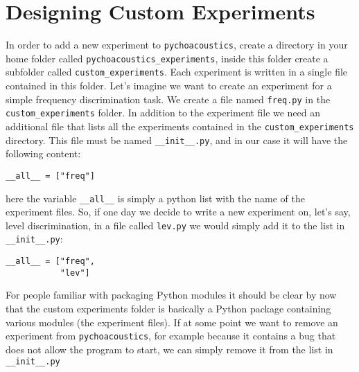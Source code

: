 \chapter{Designing Custom Experiments}
\label{sec:cutom_exp}

In order to add a new experiment to \texttt{pychoacoustics}, create a directory in your home folder called \texttt{pychoacoustics\_experiments}, inside this folder create a subfolder called \texttt{custom\_experiments}. Each experiment is written in a single file contained in this folder. Let's imagine we want to create an experiment for a simple frequency discrimination task. We create a file named \verb+freq.py+ in the \texttt{custom\_experiments} folder. In addition to the experiment file we need an additional file that lists all the experiments contained in the \texttt{custom\_experiments} directory. This file must be named \verb+__init__.py+, and in our case it will have the following content:
\begin{lstlisting}[stepnumber=0]
__all__ = ["freq"]
\end{lstlisting}


here the variable \verb+__all__+ is simply a python list with the name of the experiment files. So, if one day we decide to write a new experiment on, let's say, level discrimination, in a file called \verb+lev.py+ we would simply add it to the list in \verb+__init__.py+:
\begin{lstlisting}[stepnumber=0]
__all__ = ["freq",
           "lev"]
\end{lstlisting}
For people familiar with packaging Python modules it should be clear by now that the custom experiments folder is basically a Python package containing various modules (the experiment files). If at some point we want to remove an experiment from \texttt{pychoacoustics}, for example because it contains a bug that does not allow the program to start, we can simply remove it from the list in \verb+__init__.py+

